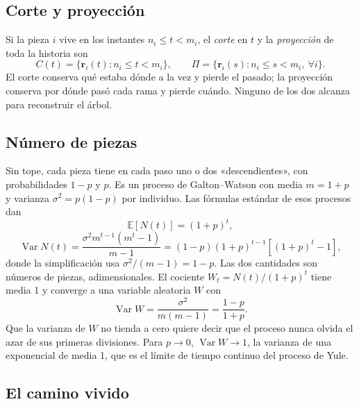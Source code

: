 \documentclass[11pt,a4paper]{article}
\begin{document}
\subsection{Corte y proyección}

Si la pieza $i$ vive en los instantes $n_i \le t < m_i$, el \emph{corte} en $t$ y la \emph{proyección} de toda la historia son
\begin{equation}\label{eq:corte}
C(t) = \{\mathbf r_i(t) : n_i \le t < m_i\}, \qquad \Pi = \{\mathbf r_i(s) : n_i \le s < m_i,\ \forall i\}.
\end{equation}
El corte conserva qué estaba dónde a la vez y pierde el pasado; la proyección conserva por dónde pasó cada rama y pierde cuándo. Ninguno de los dos alcanza para reconstruir el árbol.

\subsection{Número de piezas}

Sin tope, cada pieza tiene en cada paso uno o dos «descendientes», con probabilidades $1-p$ y $p$. Es un proceso de Galton--Watson con media $m = 1 + p$ y varianza $\sigma^2 = p(1-p)$ por individuo. Las fórmulas estándar de esos procesos \parencite{harris1963} dan
\begin{equation}\label{eq:media}
\mathbb E[N(t)] = (1+p)^t ,
\end{equation}
\begin{equation}\label{eq:varianza}
\operatorname{Var} N(t) = \frac{\sigma^2 m^{t-1}(m^t - 1)}{m - 1} = (1-p)(1+p)^{t-1}\left[(1+p)^t - 1\right],
\end{equation}
donde la simplificación usa $\sigma^2/(m-1) = 1-p$. Las dos cantidades son números de piezas, adimensionales. El cociente $W_t = N(t)/(1+p)^t$ tiene media 1 y converge a una variable aleatoria $W$ con
\begin{equation}\label{eq:W}
\operatorname{Var} W = \frac{\sigma^2}{m(m-1)} = \frac{1-p}{1+p}.
\end{equation}
Que la varianza de $W$ no tienda a cero quiere decir que el proceso nunca olvida el azar de sus primeras divisiones. Para $p \to 0$, $\operatorname{Var} W \to 1$, la varianza de una exponencial de media 1, que es el límite de tiempo continuo del proceso de Yule.

\subsection{El camino vivido}
\end{document}
